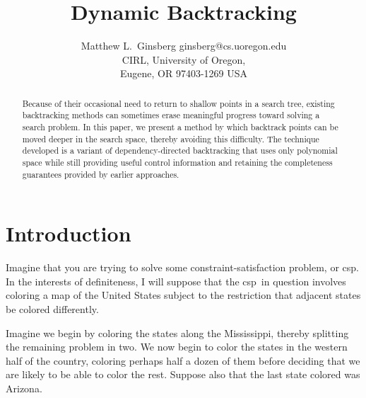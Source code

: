 




\title{Dynamic Backtracking}

\author{\name Matthew L.~Ginsberg \email ginsberg@cs.uoregon.edu \\
       \addr CIRL,
       University of Oregon,\\
       Eugene, OR  97403-1269 USA}

\maketitle


\begin{abstract}
 Because of their occasional need to return to shallow points in a
search tree, existing backtracking methods can sometimes erase
meaningful progress toward solving a search problem.  In this paper,
we present a method by which backtrack points can be moved deeper in
the search space, thereby avoiding this difficulty.  The technique
developed is a variant of dependency-directed backtracking that uses
only polynomial space while still providing useful control information
and retaining the completeness guarantees provided by earlier
approaches.
\end{abstract}

\newcommand{\csp}{{\sc csp}}
\newcommand{\ddb}{dependency-directed backtracking}
\newcommand{\Ddb}{Dependency-directed backtracking}
\newcommand{\ebar}{e_V}
\newcommand{\nbar}{n_V}
\newcommand{\Pbar}{\overline P}
\newcommand{\Ebar}{\widehat E}
\newcommand{\epsbar}{\widehat\epsilon}
\newcommand{\expl}[2]{#1 [#2]}

\section{Introduction}

Imagine that you are trying to solve some constraint-satisfaction
problem, or \csp.  In the interests of definiteness, I will suppose
that the \csp\ in question involves coloring a map of the United
States subject to the restriction that adjacent states be colored
differently.

Imagine we begin by coloring the states along the Mississippi, thereby
splitting the remaining problem in two.  We now begin to color the
states in the western half of the country, coloring perhaps half a
dozen of them before deciding that we are likely to be able to color
the rest.  Suppose also that the last state colored was Arizona.

